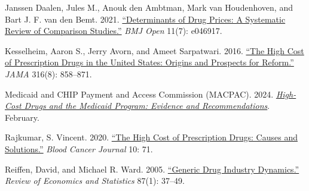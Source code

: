 \begin{singlespace}
\begin{list}{}{
    \setlength{\leftmargin}{1.5em}
    \setlength{\itemindent}{-1.5em}
    \setlength{\itemsep}{0.75\baselineskip}
    \setlength{\parsep}{0pt}
}
\item
Janssen Daalen, Jules M., Anouk den Ambtman, Mark van Houdenhoven,
and Bart J. F. van den Bemt. 2021.
\href{https://doi.org/10.1136/bmjopen-2020-046917}{``Determinants of Drug Prices: A Systematic Review of Comparison Studies.''}
\textit{BMJ Open} 11(7): e046917.

\item
Kesselheim, Aaron S., Jerry Avorn, and Ameet Sarpatwari. 2016.
\href{https://doi.org/10.1001/jama.2016.11237}{``The High Cost of Prescription Drugs in the United States: Origins and Prospects for Reform.''}
\textit{JAMA} 316(8): 858--871.

\item
Medicaid and CHIP Payment and Access Commission (MACPAC). 2024.
\href{https://www.macpac.gov/wp-content/uploads/2024/02/Policy-in-Brief-High-Cost-Drugs-FINAL-2.pdf}{\textit{High-Cost Drugs and the Medicaid Program: Evidence and Recommendations}}.
February.

\item
Rajkumar, S. Vincent. 2020.
\href{https://doi.org/10.1038/s41408-020-0338-x}{``The High Cost of Prescription Drugs: Causes and Solutions.''}
\textit{Blood Cancer Journal} 10: 71.

\item
Reiffen, David, and Michael R. Ward. 2005.
\href{https://doi.org/10.1162/0034653053327694}{``Generic Drug Industry Dynamics.''}
\textit{Review of Economics and Statistics} 87(1): 37--49.

\end{list}
\end{singlespace}
\endgroup
